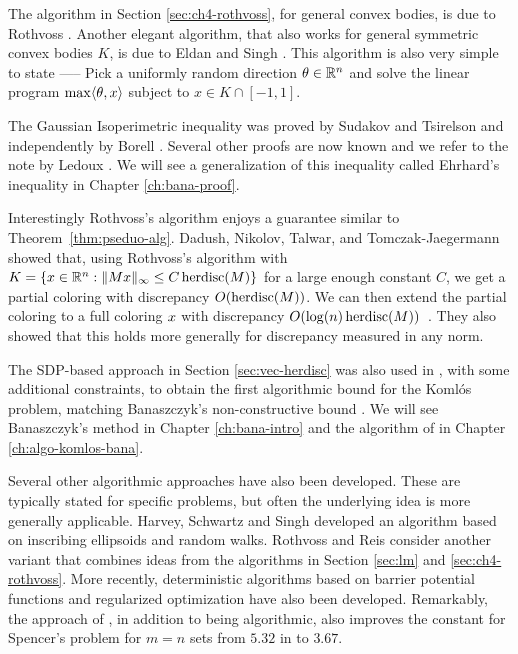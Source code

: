 The algorithm in Section \ref{sec:ch4-rothvoss}, for general convex bodies, is due to Rothvoss \cite{Rothvoss17}.
Another elegant algorithm, that also works for general symmetric convex bodies $K$, is due to Eldan and Singh \cite{EldanS18}. This algorithm is also very simple to state ----- Pick a uniformly random direction $\theta \in \mathbb{R}^n$ and solve the linear program $\max \langle \theta,x\rangle$ subject to $x \in K \cap [-1,1]$. 

The Gaussian Isoperimetric inequality was proved by Sudakov and Tsirelson \cite{sudakov-tsirelson78} and independently by Borell \cite{Borell75}. Several other proofs are now known and we refer to the note by Ledoux \cite{Ledoux-survey}. We will see a generalization of this inequality called  Ehrhard's inequality in Chapter \ref{ch:bana-proof}.

Interestingly Rothvoss's algorithm enjoys a guarantee similar to Theorem~\ref{thm:pseduo-alg}. Dadush, Nikolov, Talwar, and Tomczak-Jaegermann showed that, using Rothvoss's algorithm with $K = \{x \in \mathbb{R}^n: \|M x\|_{\infty} \le C\operatorname{herdisc}(M)\}$ for a large enough constant $C$, we get a partial coloring with discrepancy $O(\operatorname{herdisc}(M))$. We can then extend the partial coloring to a full coloring $x$ with discrepancy $O(\log(n)\operatorname{herdisc}(M))$~\cite{anynorm}. They also showed that this holds more generally for discrepancy measured in any norm. 


The SDP-based approach in Section \ref{sec:vec-herdisc} was also used in \cite{BDG16}, with some additional constraints, to obtain the first algorithmic bound for the Koml\'{o}s problem, matching Banaszczyk's non-constructive  bound \cite{Bana98}. We will see Banaszczyk's method in Chapter \ref{ch:bana-intro} and the algorithm of \cite{BDG16} in Chapter \ref{ch:algo-komlos-bana}.  



Several other algorithmic approaches have also been developed. 
These are typically stated for specific problems, but often the underlying idea is more generally applicable.
Harvey, Schwartz and Singh \cite{HSS14}  developed an algorithm based on inscribing ellipsoids and random walks.  
Rothvoss and Reis \cite{ReisR23} consider another variant that combines ideas from the algorithms in Section \ref{sec:lm} and \ref{sec:ch4-rothvoss}.
More recently, deterministic algorithms based on 
barrier potential functions \cite{BansalLV22} and regularized optimization \cite{PesentiV23} have also been developed. Remarkably, the approach of \cite{PesentiV23}, in addition to being algorithmic, also improves the constant for Spencer's problem for $m=n$ sets from  $5.32$ in \cite{spencer1985} to $3.67$.


